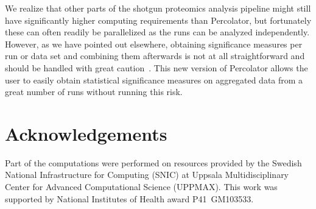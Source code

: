 \documentclass{article}
\begin{document}
We realize that other parts of the shotgun proteomics analysis
pipeline might still have significantly higher computing requirements
than Percolator, but fortunately these can often readily be
parallelized as the runs can be analyzed independently. However, as we
have pointed out elsewhere, obtaining significance measures per run or
data set and combining them afterwards is not at all straightforward
and should be handled with great caution~\cite{serang2015solution}.
This new version of Percolator allows the user to easily obtain
statistical significance measures on aggregated data from a great
number of runs without running this risk.

\section*{Acknowledgements}

Part of the computations were performed on resources provided by the
Swedish National Infrastructure for Computing (SNIC) at Uppsala
Multidisciplinary Center for Advanced Computational Science (UPPMAX).
This work was supported by National Institutes of Health award
P41~GM103533.



\end{document}
